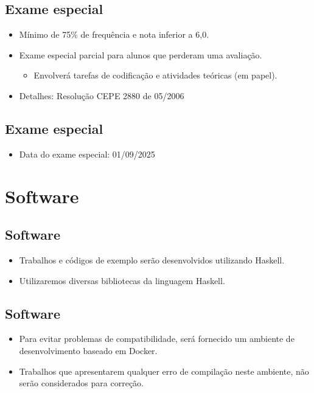 \documentclass[11pt]{article}
\begin{document}
\subsection*{Exame especial}
\label{sec:orgcf8aabd}

\begin{itemize}
\item Mínimo de 75\% de frequência e nota inferior a 6,0.

\item Exame especial parcial para alunos que perderam uma avaliação.

\begin{itemize}
\item Envolverá tarefas de codificação e atividades teóricas (em papel).
\end{itemize}

\item Detalhes: Resolução CEPE 2880 de 05/2006
\end{itemize}
\subsection*{Exame especial}
\label{sec:orgbfbdb04}

\begin{itemize}
\item Data do exame especial: 01/09/2025
\end{itemize}
\section*{Software}
\label{sec:orge4f4a0c}

\subsection*{Software}
\label{sec:org7b9ce34}

\begin{itemize}
\item Trabalhos e códigos de exemplo serão desenvolvidos utilizando Haskell.

\item Utilizaremos diversas bibliotecas da linguagem Haskell.
\end{itemize}
\subsection*{Software}
\label{sec:org1bd78dc}

\begin{itemize}
\item Para evitar problemas de compatibilidade, será fornecido um ambiente de desenvolvimento baseado em Docker.

\item Trabalhos que apresentarem qualquer erro de compilação neste ambiente, não serão considerados para correção.
\end{itemize}
\end{document}
